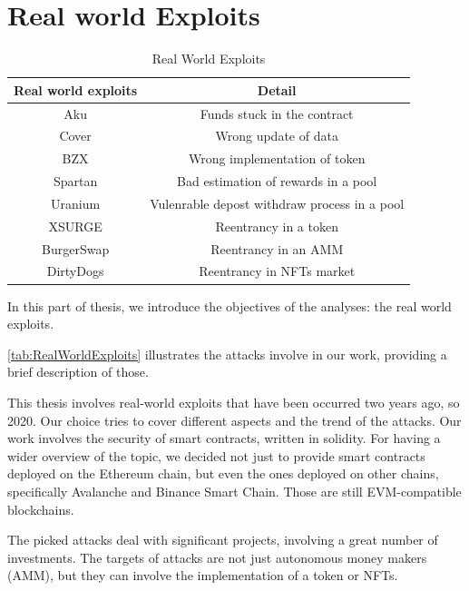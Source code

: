 \chapter{Real world Exploits}
\label{ch:Exploits}
\begin{table}
    \caption{Real World Exploits}
        \label{tab:RealWorldExploits}
        \begin{tabular}{cc}
        \toprule
            Real world exploits & Detail\\
            \midrule
            Aku & Funds stuck in the contract\\
            Cover & Wrong update of data\\
            BZX & Wrong implementation of token\\
            Spartan &  Bad estimation of rewards in a pool\\
            Uranium & Vulenrable depost withdraw process in a pool\\
            XSURGE &  Reentrancy in a token \\
            BurgerSwap &  Reentrancy in an AMM \\
            DirtyDogs &  Reentrancy in NFTs market \\
        \bottomrule
        \end{tabular}
    \end{table}

In this part of thesis, we introduce the objectives of the analyses: the real world exploits. 

\autoref{tab:RealWorldExploits} illustrates the attacks involve in our work, providing a brief description of those. 

This thesis involves real-world exploits that have been occurred two years ago, so 2020. 
Our choice tries to cover different aspects and the trend of the attacks. 
Our work involves the security of smart contracts, written in solidity. 
For having a wider overview of the topic, 
we decided not just to provide smart contracts deployed on the Ethereum chain, 
but even the ones deployed on other chains, specifically Avalanche and Binance Smart Chain. 
Those are still EVM-compatible blockchains. 

The picked attacks deal with significant projects, involving a great number of investments. 
The targets of attacks are not just autonomous money makers (AMM), but they can involve the implementation of a token or NFTs.

